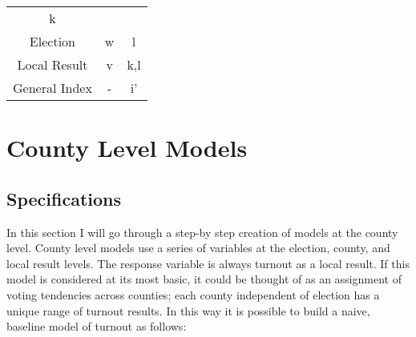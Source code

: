 \documentclass[12pt,twoside]{reedthesis}
\begin{document}
\begin{longtable}[]{@{}ccc@{}}
\begin{minipage}[t]{0.15\columnwidth}
  k\strut
  \end{minipage}\tabularnewline
  \begin{minipage}[t]{0.27\columnwidth}\centering\strut
  Election\strut
  \end{minipage} & \begin{minipage}[t]{0.20\columnwidth}\centering\strut
  w\strut
  \end{minipage} & \begin{minipage}[t]{0.15\columnwidth}\centering\strut
  l\strut
  \end{minipage}\tabularnewline
  \begin{minipage}[t]{0.27\columnwidth}\centering\strut
  Local Result\strut
  \end{minipage} & \begin{minipage}[t]{0.20\columnwidth}\centering\strut
  v\strut
  \end{minipage} & \begin{minipage}[t]{0.15\columnwidth}\centering\strut
  k,l\strut
  \end{minipage}\tabularnewline
  \begin{minipage}[t]{0.27\columnwidth}\centering\strut
  General Index\strut
  \end{minipage} & \begin{minipage}[t]{0.20\columnwidth}\centering\strut
  -\strut
  \end{minipage} & \begin{minipage}[t]{0.15\columnwidth}\centering\strut
  i'\strut
  \end{minipage}\tabularnewline
  \bottomrule
  \end{longtable}
  
  \section{County Level Models}\label{county-level-models}
  
  \subsection{Specifications}\label{specifications}
  
  In this section I will go through a step-by step creation of models at
  the county level. County level models use a series of variables at the
  election, county, and local result levels. The response variable is
  always turnout as a local result. If this model is considered at its
  most basic, it could be thought of as an assignment of voting tendencies
  across counties; each county independent of election has a unique range
  of turnout results. In this way it is possible to build a naive,
  baseline model of turnout as follows:
  
\end{document}

